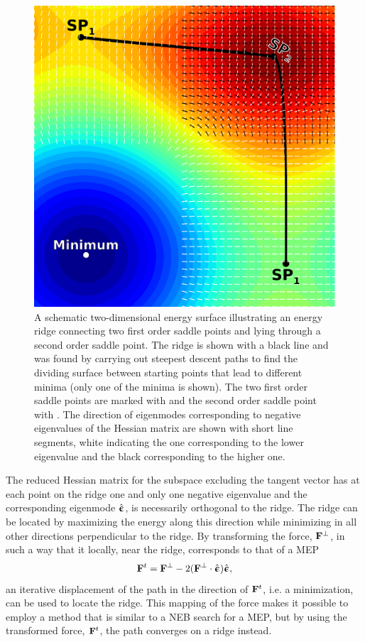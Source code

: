 \begin{figure}[t]
\begin{center}
\includegraphics[width=0.5\linewidth]{figures/modes}
\caption{A schematic two-dimensional energy surface illustrating an energy ridge connecting two first order saddle points and lying through a second order saddle point.
The ridge is shown with a black line and was found by carrying out steepest descent paths to find the dividing surface between starting points that lead to different minima (only one of the minima is shown).
The two first order saddle points are marked with  and the second order saddle point with .
The direction of eigenmodes corresponding to negative eigenvalues of the Hessian matrix are shown with short line segments, white indicating the one corresponding to the lower eigenvalue and the black corresponding to the higher one.
}
\label{fig:modes}
\end{center}
\end{figure}

The reduced Hessian matrix for the subspace excluding the tangent vector has at each point on the ridge one and only one negative eigenvalue and the corresponding eigenmode $\hat{{\mathrm{\mathbf{\bm{\upepsilon}}}}}$, is necessarily orthogonal to the ridge.
The ridge can be located by maximizing the energy along this direction while minimizing in all other directions perpendicular to the ridge.
By transforming the force, ${\mathrm{\mathbf{\bm{F}}}}^\perp$, in such a way that it locally, near the ridge, corresponds to that of a MEP
\begin{equation}
{\ensuremath{\mathrm{\mathbf{\bm{F}}}}}^t = {\mathrm{\mathbf{\bm{F}}}}^\perp - 2 ({\mathrm{\mathbf{\bm{F}}}}^\perp \cdot \hat{{\mathrm{\mathbf{\bm{\upepsilon}}}}}) \hat{{\mathrm{\mathbf{\bm{\upepsilon}}}}},
\label{eq:force-mapping}
\end{equation}
an iterative displacement of the path in the direction of ${\mathrm{\mathbf{\bm{F}}}}^t$, i.e. a minimization, can be used to locate the ridge.
This mapping of the force makes it possible to employ a method that is similar to a NEB search for a MEP, but by using the transformed force, ${\mathrm{\mathbf{\bm{F}}}}^t$, the path converges on a ridge instead.

